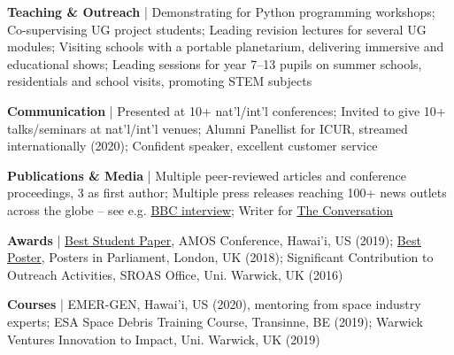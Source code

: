 \documentclass[10pt,a4paper]{altacv}
\begin{document}
\smallskip

\textbf{Teaching \& Outreach} | Demonstrating for Python programming workshops; Co-supervising UG project students; Leading revision lectures for several UG modules; Visiting schools with a portable planetarium, delivering immersive and educational shows; Leading sessions for year 7--13 pupils on summer schools, residentials and school visits, promoting STEM subjects

\smallskip

\textbf{Communication} | Presented at 10+ nat'l/int'l conferences; Invited to give 10+ talks/seminars at nat'l/int'l venues; Alumni Panellist for ICUR, streamed internationally (2020); Confident speaker, excellent customer service

\smallskip

\textbf{Publications \& Media} | Multiple peer-reviewed articles and conference proceedings, 3 as first author; Multiple press releases reaching 100+ news outlets across the globe -- see e.g. \href{https://www.youtube.com/watch?v=ccHlPwxHIN4&list=LLrNAf9mR4fHTqvYkXHg5PuA&index=1&t=1s&ab_channel=DavidGregory-Kumar}{BBC interview}; Writer for \href{https://theconversation.com/five-reasons-future-space-travel-should-explore-asteroids-119246}{The Conversation}

\smallskip

\textbf{Awards} | \href{https://amostech.com/2019-archive/}{Best Student Paper}, AMOS Conference, Hawai'i, US (2019); \href{https://warwick.ac.uk/fac/cross_fac/iatl/news/posters-in-parliament-2018}{Best Poster}, Posters in Parliament, London, UK (2018); Significant Contribution to Outreach Activities, SROAS Office, Uni. Warwick, UK (2016)

\smallskip

\textbf{Courses} | EMER-GEN, Hawai'i, US (2020), mentoring from space industry experts; ESA Space Debris Training Course, Transinne, BE (2019); Warwick Ventures Innovation to Impact, Uni. Warwick, UK (2019)
\end{document}
